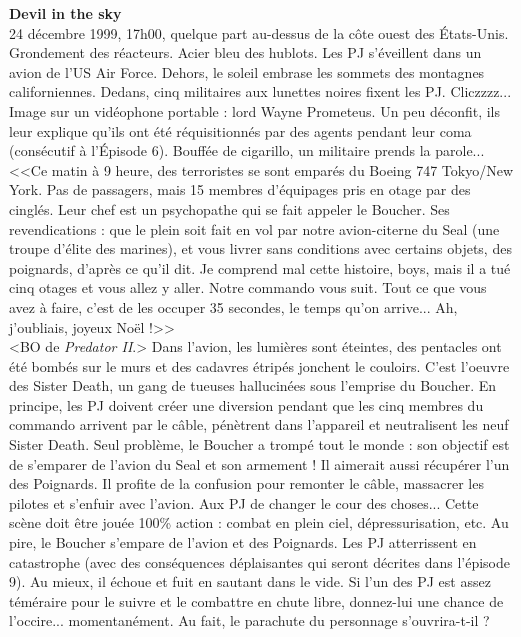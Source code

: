 \documentclass[11pt,twoside,a4paper]{book}
\begin{document}
\textbf{\large Devil in the sky}~\\

24 d{\'e}cembre 1999, 17h00, quelque part au-dessus de la c{\^o}te ouest des {\'E}tats-Unis. Grondement des r{\'e}acteurs. Acier bleu des hublots. Les PJ s'{\'e}veillent dans un avion de l'US Air Force. Dehors, le soleil embrase les sommets des montagnes californiennes. Dedans, cinq militaires aux lunettes noires fixent les PJ. Cliczzzz... Image sur un vid{\'e}ophone portable : lord Wayne Prometeus. Un peu d{\'e}confit, ils leur explique qu'ils ont {\'e}t{\'e} r{\'e}quisitionn{\'e}s par des agents pendant leur coma (cons{\'e}cutif {\`a} l'{\'E}pisode 6). Bouff{\'e}e de cigarillo, un militaire prends la parole...~\\

<<Ce matin {\`a} 9 heure, des terroristes se sont empar{\'e}s du Boeing 747 Tokyo/New York. Pas de passagers, mais 15 membres d'{\'e}quipages pris en otage par des cingl{\'e}s. Leur chef est un psychopathe qui se fait appeler le Boucher. Ses revendications : que le plein soit fait en vol par notre avion-citerne du Seal (une troupe d'{\'e}lite des marines), et vous livrer sans conditions avec certains objets, des poignards, d'apr{\`e}s ce qu'il dit. Je comprend mal cette histoire, boys, mais il a tu{\'e} cinq otages et vous allez y aller. Notre commando vous suit. Tout ce que vous avez {\`a} faire, c'est de les occuper 35 secondes, le temps qu'on arrive... Ah, j'oubliais, joyeux No{\"e}l !>>~\\

<BO de \emph{Predator II}.> Dans l'avion, les lumi{\`e}res sont {\'e}teintes, des pentacles ont {\'e}t{\'e} bomb{\'e}s sur le murs et des cadavres {\'e}trip{\'e}s jonchent le couloirs. C'est l'oeuvre des Sister Death, un gang de tueuses hallucin{\'e}es sous l'emprise du Boucher. En principe, les PJ doivent cr{\'e}er une diversion pendant que les cinq membres du commando arrivent par le c{\^a}ble, p{\'e}n{\`e}trent dans l'appareil et neutralisent les neuf Sister Death. Seul probl{\`e}me, le Boucher a tromp{\'e} tout le monde : son objectif est de s'emparer de l'avion du Seal et son armement ! Il aimerait aussi r{\'e}cup{\'e}rer l'un des Poignards. Il profite de la confusion pour remonter le c{\^a}ble, massacrer les pilotes et s'enfuir avec l'avion. Aux PJ de changer le cour des choses... Cette sc{\`e}ne doit {\^e}tre jou{\'e}e 100\% action : combat en plein ciel, d{\'e}pressurisation, etc. Au pire, le Boucher s'empare de l'avion et des Poignards. Les PJ atterrissent en catastrophe (avec des cons{\'e}quences d{\'e}plaisantes qui seront d{\'e}crites dans l'{\'e}pisode 9). Au mieux, il {\'e}choue et fuit en sautant dans le vide. Si l'un des PJ est assez t{\'e}m{\'e}raire pour le suivre et le combattre en chute libre, donnez-lui une chance de l'occire... momentan{\'e}ment. Au fait, le parachute du personnage s'ouvrira-t-il ?~\\
\end{document}
